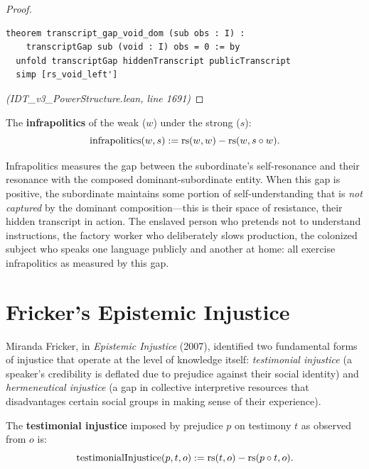 \begin{proof}
\begin{lstlisting}
theorem transcript_gap_void_dom (sub obs : I) :
    transcriptGap sub (void : I) obs = 0 := by
  unfold transcriptGap hiddenTranscript publicTranscript
  simp [rs_void_left']
\end{lstlisting}
\textit{(IDT\_v3\_PowerStructure.lean, line 1691)}
\end{proof}

\begin{definition}[Infrapolitics]
\label{def:infrapolitics}
The \textbf{infrapolitics} of the weak ($w$) under the strong ($s$):
\[
  \mathrm{infrapolitics}(w, s) := \mathrm{rs}(w, w) - \mathrm{rs}(w, s \circ w).
\]
\end{definition}

\begin{interpretation}
Infrapolitics measures the gap between the subordinate's self-resonance and
their resonance with the composed dominant-subordinate entity. When this gap
is positive, the subordinate maintains some portion of self-understanding that
is \emph{not captured} by the dominant composition---this is their space of
resistance, their hidden transcript in action. The enslaved person who pretends
not to understand instructions, the factory worker who deliberately slows
production, the colonized subject who speaks one language publicly and another
at home: all exercise infrapolitics as measured by this gap.
\end{interpretation}

\section{Fricker's Epistemic Injustice}

Miranda Fricker, in \emph{Epistemic Injustice} (2007), identified two
fundamental forms of injustice that operate at the level of knowledge itself:
\emph{testimonial injustice} (a speaker's credibility is deflated due to
prejudice against their social identity) and \emph{hermeneutical injustice}
(a gap in collective interpretive resources that disadvantages certain social
groups in making sense of their experience).

\begin{definition}
\label{def:testimonial-injustice}
The \textbf{testimonial injustice} imposed by prejudice $p$ on testimony $t$
as observed from $o$ is:
\[
  \mathrm{testimonialInjustice}(p, t, o) := \mathrm{rs}(t, o) - \mathrm{rs}(p \circ t, o).
\]
\end{definition}

